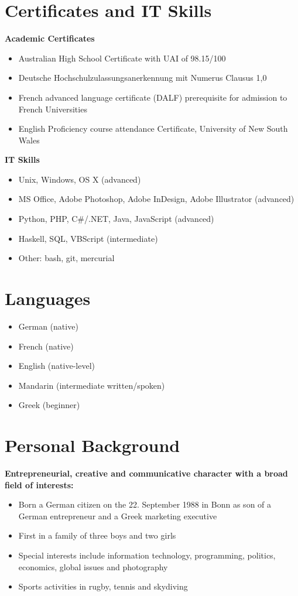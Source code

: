 \documentclass[margin]{res}
\begin{document}
\begin{resume}
\section{Certificates and IT Skills}
  {\bf Academic Certificates}
  \begin{itemize} \itemsep -0.5pt 
  \item Australian High School Certificate with UAI of 98.15/100
  \item Deutsche Hochschulzulassungsanerkennung mit Numerus Clausus 1,0
  \item French advanced language certificate (DALF) prerequisite for admission to French Universities
  \item English Proficiency course attendance Certificate, University of New South Wales
  \end{itemize}
  {\bf IT Skills}
  \begin{itemize} \itemsep -0.5pt 
  \item Unix, Windows, OS X (advanced)
  \item MS Office, Adobe Photoshop, Adobe InDesign, Adobe Illustrator (advanced)
  \item Python, PHP, C\#/.NET, Java, JavaScript (advanced)
  \item Haskell, SQL, VBScript (intermediate)
  \item Other: bash, git, mercurial
  \end{itemize}

\section{Languages}
  \begin{itemize} \itemsep -0.5pt 
  \item German (native)
  \item French (native)
  \item English (native-level)
  \item Mandarin (intermediate written/spoken)
  \item Greek (beginner)
  \end{itemize}

\section{Personal Background}
{\bf Entrepreneurial, creative and communicative character with a broad field of interests:}
  \begin{itemize} \itemsep -0.5pt 
  \item Born a German citizen on the 22. September 1988 in Bonn as son of a German entrepreneur and a Greek marketing executive
  \item First in a family of three boys and two girls
  \item Special interests include information technology, programming, politics, economics, global issues and photography
  \item Sports activities in rugby, tennis and skydiving
  \end{itemize}


\end{resume}
\end{document}
